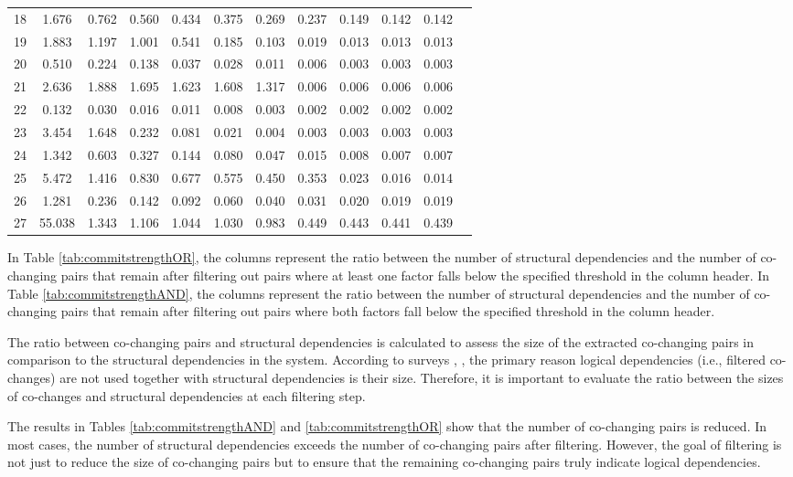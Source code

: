 \begin{table}[!h]
{\begin{tabular}{|c|cccccccccc|c|}
18 & 1.676 & 0.762 & 0.560 & 0.434 & 0.375 & 0.269 & 0.237 & 0.149 & 0.142 & 0.142 \\
19 & 1.883 & 1.197 & 1.001 & 0.541 & 0.185 & 0.103 & 0.019 & 0.013 & 0.013 & 0.013 \\
20 & 0.510 & 0.224 & 0.138 & 0.037 & 0.028 & 0.011 & 0.006 & 0.003 & 0.003 & 0.003 \\
21 & 2.636 & 1.888 & 1.695 & 1.623 & 1.608 & 1.317 & 0.006 & 0.006 & 0.006 & 0.006 \\
22 & 0.132 & 0.030 & 0.016 & 0.011 & 0.008 & 0.003 & 0.002 & 0.002 & 0.002 & 0.002 \\
23 & 3.454 & 1.648 & 0.232 & 0.081 & 0.021 & 0.004 & 0.003 & 0.003 & 0.003 & 0.003 \\
24 & 1.342 & 0.603 & 0.327 & 0.144 & 0.080 & 0.047 & 0.015 & 0.008 & 0.007 & 0.007 \\
25 & 5.472 & 1.416 & 0.830 & 0.677 & 0.575 & 0.450 & 0.353 & 0.023 & 0.016 & 0.014 \\
26 & 1.281 & 0.236 & 0.142 & 0.092 & 0.060 & 0.040 & 0.031 & 0.020 & 0.019 & 0.019 \\
27 & 55.038 & 1.343 & 1.106 & 1.044 & 1.030 & 0.983 & 0.449 & 0.443 & 0.441 & 0.439 \\
\hline
\end{tabular}
}
\end{table}

In Table \ref{tab:commitstrengthOR}, the columns represent the ratio between the number of structural dependencies and the number of co-changing pairs that remain after filtering out pairs where at least one factor falls below the specified threshold in the column header.
In Table \ref{tab:commitstrengthAND}, the columns represent the ratio between the number of structural dependencies and the number of co-changing pairs that remain after filtering out pairs where both factors fall below the specified threshold in the column header.

The ratio between co-changing pairs and structural dependencies is calculated to assess the size of the extracted co-changing pairs in comparison to the structural dependencies in the system. According to surveys \cite{Shtern:2012:CMS:2332427.2332428}, \cite{sar}, the primary reason logical dependencies (i.e., filtered co-changes) are not used together with structural dependencies is their size. Therefore, it is important to evaluate the ratio between the sizes of co-changes and structural dependencies at each filtering step.

The results in Tables \ref{tab:commitstrengthAND} and \ref{tab:commitstrengthOR} show that the number of co-changing pairs is reduced. In most cases, the number of structural dependencies exceeds the number of co-changing pairs after filtering. However, the goal of filtering is not just to reduce the size of co-changing pairs but to ensure that the remaining co-changing pairs truly indicate logical dependencies.

